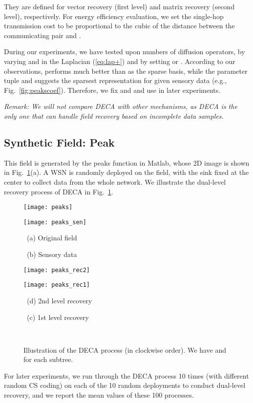 \documentclass[conference]{IEEEtran}
\begin{document}
They are defined for vector recovery (first level) and matrix recovery (second level), respectively. For energy efficiency evaluation, we set the single-hop transmission cost  to be proportional to the cubic of the distance between the communicating pair  and .

    During our experiments, we have tested upon numbers of diffusion operators, by varying  and  in the Laplacian (\ref{eq:lap+}) and by setting  or . According to our observations,  performs much better than  as the sparse basis, while the parameter tuple  and  suggests the sparsest representation for given sensory data (e.g., Fig.~\ref{fig:peakscoef}). Therefore, we fix  and  and use  in later experiments.

    \vspace{1ex}\noindent\emph{Remark: We will not compare DECA with other mechanisms, as DECA is the only one that can handle field recovery based on incomplete data samples.}

  \subsection{Synthetic Field: Peak} \label{sec:peak}
This field is generated by the \textsf{peaks} function in Matlab, whose 2D image is shown in Fig.~\ref{fig:peaksdata}(a). A WSN is randomly deployed on the field, with the sink fixed at the center to collect data from the whole network. We illustrate the dual-level recovery process of DECA in Fig.~\ref{fig:peaksdata}.
    \begin{figure}[ht]
      \begin{center}
\parbox{.48\columnwidth}{\center \texttt{[image: peaks]}}
        \parbox{.48\columnwidth}{\center \texttt{[image: peaks\_sen]}}
        \parbox{.48\columnwidth}{\center\scriptsize~(a) Original field }
        \parbox{.48\columnwidth}{\center\scriptsize~(b) Sensory data }
        \parbox{.48\columnwidth}{\center \texttt{[image: peaks\_rec2]}} \parbox{.48\columnwidth}{\center \texttt{[image: peaks\_rec1]}} \parbox{.48\columnwidth}{\center\scriptsize~(d) 2nd level recovery }\parbox{.48\columnwidth}{\center\scriptsize~(c) 1st level recovery }\\\caption{Illustration of the DECA process (in clockwise order). We have  and  for each subtree.}
        \label{fig:peaksdata}
      \end{center}
\end{figure}
For later experiments, we run through the DECA process 10 times (with different random CS coding) on each of the 10 random deployments to conduct dual-level recovery, and we report the mean values of these 100 processes.
\end{document}
